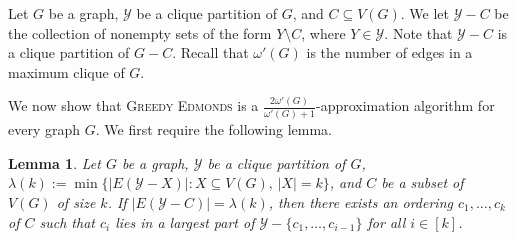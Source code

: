 \documentclass[a4paper,fleqn]{cas-sc}
\newtheorem{lem}[thm]{Lemma}
\newtheorem{prop}[thm]{Proposition}
\theoremstyle{remark}
\theoremstyle{plain}
\newcommand{\cd}{\textsc{Cluster Deletion}}
\newcommand{\cp}{\textsc{Clique Partition}}
\newcommand{\greedy}{{\textsc{Greedy}}}
\newcommand{\edmonds}{{\textsc{Greedy Edmonds}}}
\begin{document}




Let $G$ be a graph, $\mathcal{Y}$ be a clique partition of $G$, and $C \subseteq V(G)$.   We let $\mathcal{Y}-C$ be the collection of nonempty sets of the form $Y\setminus C$, where $Y \in \mathcal{Y}$.  Note that $\mathcal{Y}-C$ is a clique partition of $G-C$.  Recall that $\omega'(G)$ is the number of edges in a maximum clique of $G$.


We now show that \edmonds{} is a $\frac{2\omega'(G)}{\omega'(G)+1}$-approximation algorithm for every graph $G$.
We first require the following lemma.


\begin{lem} \label{lem:ordering}
    Let $G$ be a graph, $\mathcal{Y}$ be a clique partition of $G$,
    $\lambda(k):=\min\{|E(\mathcal{Y}-X)|: X\subseteq V(G),\, |X|=k\}$, and $C$ be a subset of $V(G)$ of size $k$.  If $|E(\mathcal{Y}-C)|=\lambda(k)$, then there exists an ordering $c_1, \dots, c_k$ of $C$ such that $c_i$ lies in a largest part of $\mathcal{Y}-\{c_1, \dots, c_{i-1}\}$ for all $i \in [k]$.  
\end{lem}
\end{document}
